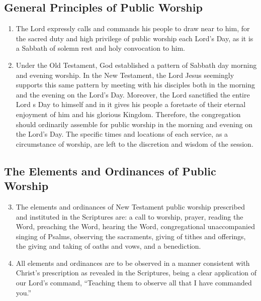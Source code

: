 \subsection{General Principles of Public Worship}
\begin {enumerate}[label=1.\arabic*]
\item The Lord expressly calls and commands his people to draw near to him, for the sacred duty and high privilege of public worship each Lord's Day, as it is a Sabbath of solemn rest and holy convocation to him.
\item Under the Old Testament, God established a pattern of Sabbath day morning and evening worship. In the New Testament, the Lord Jesus seemingly supports this same pattern by meeting with his disciples both in the morning and the evening on the Lord's Day.  Moreover, the Lord sanctified the entire Lord
s Day to himself and in it gives his people a foretaste of their eternal enjoyment of him and his glorious Kingdom. Therefore, the congregation should ordinarily assemble for public worship in the morning and evening on the Lord's Day. The specific times and locations of each service, as a circumstance of worship, are left to the discretion and wisdom of the session.
\end {enumerate}

\subsection{The Elements and Ordinances of Public Worship}
\begin {enumerate}[label=1.\arabic*]
\setcounter{enumi}{2}
\item The elements and ordinances of New Testament public worship prescribed and instituted in the Scriptures are: a call to worship, prayer, reading the Word, preaching the Word, hearing the Word, congregational unaccompanied singing of Psalms, observing the sacraments, giving of tithes and offerings, the giving and taking of oaths and vows, and a benediction.
\item All elements and ordinances are to be observed in a manner consistent with Christ's prescription as revealed in the Scriptures, being a clear application of our Lord's command, ``Teaching them to observe all that I have commanded you.”
\end {enumerate}


